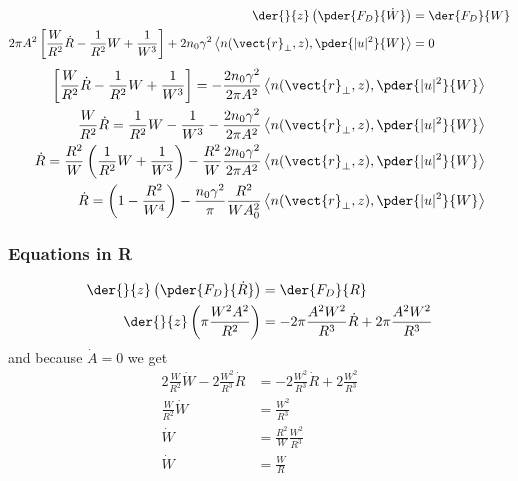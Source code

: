 \begin{equation}
\begin{split}
    \der{}{z}\left(\pder{F_{D}}{\dot{W}}\right) &= \der{F_{D}}{W} \\
    2 \pi A^2 \left[\frac{W}{R^2} \dot{R} -  \frac{1}{R^2}W + \frac{1}{W^3}\right] +  2n_0 \gamma^2 \left< n(\vect{r}_{\perp},z),\pder{|u|^2}{W}  \right>  &= 0\\
\end{split}
\end{equation}
\begin{equation}
\begin{split}
     \left[\frac{W}{R^2} \dot{R} -  \frac{1}{R^2}W + \frac{1}{W^3}\right] = -  \frac{2n_0 \gamma^2}{2 \pi A^2} \left< n(\vect{r}_{\perp},z),\pder{|u|^2}{W}  \right>  \\
     \frac{W}{R^2} \dot{R} =  \frac{1}{R^2}W - \frac{1}{W^3}  -  \frac{2n_0 \gamma^2}{2 \pi A^2} \left< n(\vect{r}_{\perp},z),\pder{|u|^2}{W}  \right>  \\
     \dot{R} =  \frac{R^2}{W} \left(\frac{1}{R^2}W + \frac{1}{W^3}\right)  -  \frac{R^2}{W}\frac{2n_0 \gamma^2}{2 \pi A^2} \left< n(\vect{r}_{\perp},z),\pder{|u|^2}{W}  \right>  \\
       \dot{R} =   \left(1 -  \frac{R^2}{W^4 }\right) -  \frac{n_0 \gamma^2}{\pi} \frac{R^2}{W A_0^2 } \left< n(\vect{r}_{\perp},z),\pder{|u|^2}{W}  \right> \\
\end{split}
\end{equation}

\subsubsection{Equations in R}
\begin{equation}
\begin{split}
   \der{}{z}\left( \pder{F_{D}}{\dot{R}} \right) &= \der{F_{D}}{R} \\
\der{}{z}\left( \pi \frac{W^2 A^2}{R^2}\right) &= - 2 \pi \frac{A^2 W^2}{R^3}\dot{R} + 2\pi \frac{A^2 W^2}{R^3}
\end{split}
\end{equation}
and because $\dot{A} = 0$ we get
\begin{equation}
\begin{split}
2 \frac{W}{R^2} \dot{W}  - 2 \frac{W^2}{R^3} \dot{R} &= -  2\frac{W^2}{R^3} \dot{R} + 2\frac{W^2}{R^3} \\
\frac{W}{R^2} \dot{W}  &=  \frac{W^2}{R^3} \\
\dot{W}  &=  \frac{R^2}{W} \frac{W^2}{R^3} \\
\dot{W}  &= \frac{W}{R} \\
\end{split}
\end{equation}

